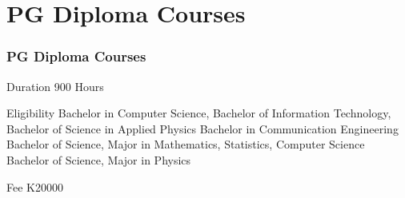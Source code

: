\section{PG Diploma Courses}

\begin{frame}
\frametitle{PG Diploma Courses}

\begin{block}{Duration}
900 Hours
\end{block}

\begin{alertblock}{Eligibility}
Bachelor in Computer Science, 
Bachelor of Information Technology, 
Bachelor of Science in Applied Physics 
Bachelor in Communication Engineering 
Bachelor of Science, Major in Mathematics, Statistics, Computer Science
Bachelor of Science, Major in Physics

\end{alertblock}


\begin{exampleblock}{Fee}
K20000
\end{exampleblock}


\end{frame}